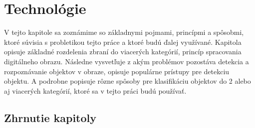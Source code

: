 \chapter{Technológie}   %
\label{chap:technologie}

V tejto kapitole sa zoznámime so základnymi pojmami, princípmi a spôsobmi, ktoré súvisia s probletikou tejto práce a ktoré budú ďalej využívané.
Kapitola opisuje základné rozdelenia zbraní do viacerých kategórií, princíp spracovania digitálneho obrazu.
Následne vysvetľuje z akým problémov pozostáva detekcia a rozpoznávanie objektov v obraze, opisuje populárne prístupy pre detekciu objektu.
A podrobne popisuje rôzne spôsoby pre klasifikáciu objektov do 2 alebo aj viacerých kategórií, ktoré sa v tejto práci budú používať.











\section{Zhrnutie kapitoly}

